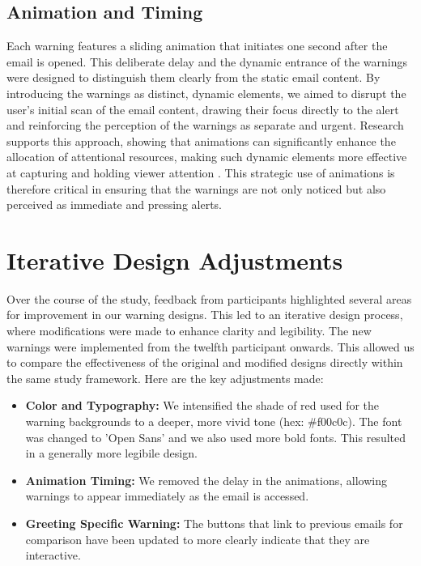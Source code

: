 \documentclass[
  a4paper,  %
  twoside,  %
  bibliography=totoc,
  headsepline,
  cleardoublepage=empty,
  parskip=half,
  draft=false
]{scrbook}
\begin{document}
\subsection{Animation and Timing}
Each warning features a sliding animation that initiates one second after the email is opened. This deliberate delay and the dynamic entrance of the warnings were designed to distinguish them clearly from the static email content. By introducing the warnings as distinct, dynamic elements, we aimed to disrupt the user's initial scan of the email content, drawing their focus directly to the alert and reinforcing the perception of the warnings as separate and urgent. Research supports this approach, showing that animations can significantly enhance the allocation of attentional resources, making such dynamic elements more effective at capturing and holding viewer attention \cite{muller}. This strategic use of animations is therefore critical in ensuring that the warnings are not only noticed but also perceived as immediate and pressing alerts.

\section{Iterative Design Adjustments}
\label{adjust}
Over the course of the study, feedback from participants highlighted several areas for improvement in our warning designs. This led to an iterative design process, where modifications were made to enhance clarity and legibility. The new warnings were implemented from the twelfth participant onwards. This allowed us to compare the effectiveness of the original and modified designs directly within the same study framework. Here are the key adjustments made:

\begin{itemize}
    \item \textbf{Color and Typography:} We intensified the shade of red used for the warning backgrounds to a deeper, more vivid tone (hex: \#f00c0c). The font was changed to 'Open Sans' and we also used more bold fonts. This resulted in a generally more legibile design.
    \item \textbf{Animation Timing:} We removed the delay in the animations, allowing warnings to appear immediately as the email is accessed.
    \item \textbf{Greeting Specific Warning:} 
    The buttons that link to previous emails for comparison have been updated to more clearly indicate that they are interactive.
\end{itemize}
\end{document}
